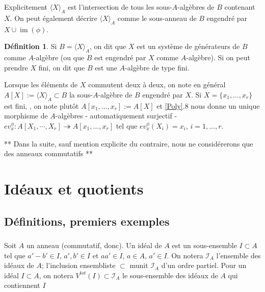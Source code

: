 \documentclass[a4paper, oneside, 12pt]{book}
\theoremstyle{theoremeStyle} %
\theoremstyle{definition} %
\newtheorem{definition}[theoreme]{Définition}
\DeclareMathOperator{\im}{im}
\begin{document}
	Explicitement $\langle X\rangle_A$ est l'intersection de tous les sous-$A$-algèbres de $B$ contenant $X$. On peut également décrire $\langle X\rangle_A$ comme  le sous-anneau de $B$ engendré par $X\cup\im(\phi)$.

	\begin{definition}Si $B=\langle X\rangle_A$, on dit que $X$ est un système de générateurs de $B$ comme $A$-algèbre (ou que $B$ est engendré par $X$ comme $A$-algèbre). Si on peut prendre $X$ fini, on dit que $B$ est une $A$-algèbre de type fini.\end{definition}

 Lorsque les éléments de $X$ commutent deux à deux, on note en général $A[X]:=\langle X\rangle_A \subset B$ la sous-$A$-algèbre de $B$ engendré par $X$. Si  $X=\lbrace x_1,\dots,x_r\rbrace $ est fini, , on note plutôt $A[x_1,\dots,x_r]:=A[X]$ et  \ref{Poly}.8  nous donne un unique morphisme de $A$-algèbres - automatiquement  surjectif - $ev_{\underline{x}}^\phi:A[X_1,\cdots, X_r]\twoheadrightarrow A[x_1,\dots, x_r] $ tel que $ev^\phi_{\underline{x}}(X_i)=x_i$, $i=1,\dots, r$. \\



 \begin{center} **  Dans la suite,  sauf mention explicite du contraire, nous ne considérerons que des anneaux commutatifs **\\\end{center}



\chapter{Idéaux et quotients}\label{Ideaux}
\section{Définitions, premiers exemples}
\subsection{}Soit $A$ un anneau (commutatif, donc). Un idéal de  $A$ est un sous-ensemble $I\subset A$ tel que $a'-b'\in I$,  $a',b'\in I$ et $aa'\in I$, $a\in A$, $a'\in I$. On notera $\mathcal{I}_A$ l'ensemble des idéaux de $A$; l'inclusion ensembliste $\subset$ munit $\mathcal{I}_A$ d'un ordre partiel. Pour un idéal $I\subset A$, on notera $V^{tot}(I)\subset \mathcal{I}_A$ le sous-ensemble des idéaux de $A$ qui contiennent $I$\\
\end{document}
